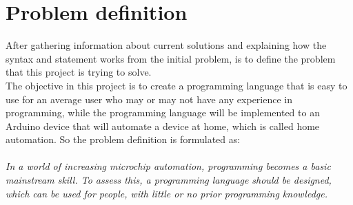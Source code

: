 \section{Problem definition}
After gathering information about current solutions and explaining how the syntax and statement works from the initial problem, is to define the problem that this project is trying to solve. \\ The objective in this project is to create a programming language that is easy to use for an average user who may or may not have any experience in programming, while the programming language will be implemented to an Arduino device that will automate a device at home, which is called home automation. So the problem definition is formulated as:\\
\\


\textit{In a world of increasing microchip automation, programming becomes a basic mainstream skill. To assess this, a programming language should be designed, which can be used for people, with little or no prior programming knowledge.}